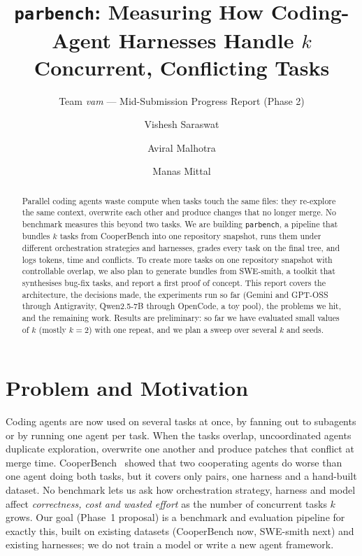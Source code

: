 \documentclass[sigconf,nonacm]{acmart}
\begin{document}
\title{\texttt{parbench}: Measuring How Coding-Agent Harnesses Handle $k$ Concurrent, Conflicting Tasks}
\subtitle{Team \textit{vam} --- Mid-Submission Progress Report (Phase 2)}

\author{Vishesh Saraswat}
\author{Aviral Malhotra}
\author{Manas Mittal}
\begin{abstract}
Parallel coding agents waste compute when tasks touch the same files: they re-explore the same context, overwrite each other and produce changes that no longer merge. No benchmark measures this beyond two tasks. We are building \texttt{parbench}, a pipeline that bundles $k$ tasks from CooperBench into one repository snapshot, runs them under different orchestration strategies and harnesses, grades every task on the final tree, and logs tokens, time and conflicts. To create more tasks on one repository snapshot with controllable overlap, we also plan to generate bundles from SWE-smith, a toolkit that synthesises bug-fix tasks, and report a first proof of concept. This report covers the architecture, the decisions made, the experiments run so far (Gemini and GPT-OSS through Antigravity, Qwen2.5-7B through OpenCode, a toy pool), the problems we hit, and the remaining work. Results are preliminary: so far we have evaluated small values of $k$ (mostly $k{=}2$) with one repeat, and we plan a sweep over several $k$ and seeds.
\end{abstract}
\maketitle

\section{Problem and Motivation}
Coding agents are now used on several tasks at once, by fanning out to subagents or by running one agent per task. When the tasks overlap, uncoordinated agents duplicate exploration, overwrite one another and produce patches that conflict at merge time. CooperBench~\cite{cooperbench} showed that two cooperating agents do worse than one agent doing both tasks, but it covers only pairs, one harness and a hand-built dataset. No benchmark lets us ask how orchestration strategy, harness and model affect \emph{correctness, cost and wasted effort} as the number of concurrent tasks $k$ grows. Our goal (Phase~1 proposal) is a benchmark and evaluation pipeline for exactly this, built on existing datasets (CooperBench now, SWE-smith next) and existing harnesses; we do not train a model or write a new agent framework.
\end{document}
